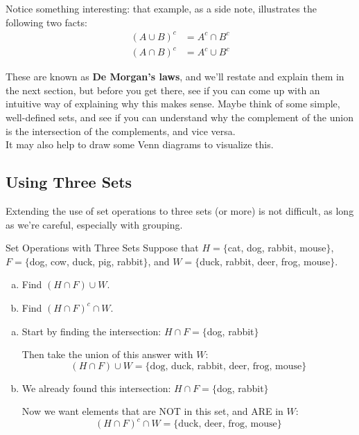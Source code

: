 Notice something interesting: that example, as a side note, illustrates the following two facts:
\begin{align*}
(A \cup B)^c &= A^c \cap B^c\\
(A \cap B)^c &= A^c \cup B^c
\end{align*}

These are known as \textbf{De Morgan's laws}, and we'll restate and explain them in the next section, but before you get there, see if you can come up with an intuitive way of explaining why this makes sense.  Maybe think of some simple, well-defined sets, and see if you can understand why the complement of the union is the intersection of the complements, and vice versa.\\

It may also help to draw some Venn diagrams to visualize this.

\subsection{Using Three Sets}

Extending the use of set operations to three sets (or more) is not difficult, as long as we're careful, especially with grouping.

\begin{example}[https://www.youtube.com/watch?v=6Ghk61fjkcM&list=PLfmpjsIzhztuvrh-T2Owgo_gO84qypSBG&index=17]{Set Operations with Three Sets}
Suppose that $H=\{$cat, dog, rabbit, mouse$\}$, $F=\{$dog, cow, duck, pig, rabbit$\}$, and $W=\{$duck, rabbit, deer, frog, mouse$\}$.
\begin{enumerate}[(a)]
\item Find $(H \cap F) \cup W$.
\item Find $(H \cap F)^c \cap W$.
\end{enumerate}

\sol
\begin{enumerate}[(a)]
\item Start by finding the intersection: $H \cap F = \{$dog, rabbit$\}$

Then take the union of this answer with $W$:
\[\boxed{(H \cap F) \cup W = \{\textrm{dog, duck, rabbit, deer, frog, mouse}\}}\]

\item We already found this intersection: $H \cap F = \{$dog, rabbit$\}$

Now we want elements that are NOT in this set, and ARE in $W$:
\[\boxed{(H \cap F)^c \cap W = \{\textrm{duck, deer, frog, mouse}\}}\]
\end{enumerate}
\end{example}


